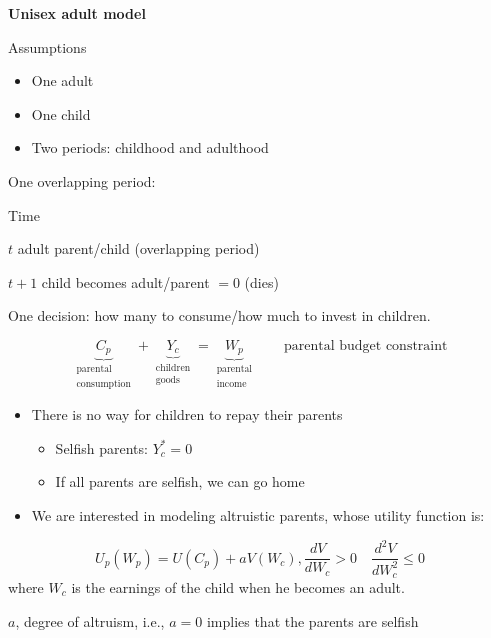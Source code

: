 \documentclass[14pt,notitlepage]{article}
\begin{document}
\vspace{10mm}

\noindent \textbf{Unisex adult model}

\noindent Assumptions

\begin{itemize}
\item One adult
\item One child
\item Two periods: childhood and adulthood
\end{itemize}

\noindent One overlapping period:

\noindent Time

$t$ adult parent/child (overlapping period)

$t+1$ child becomes adult/parent $= 0$ (dies)

\noindent One decision: how many to consume/how much to invest in children.

\begin{equation*}
\underbrace{C_{p}}_{\substack{\text{parental} \\ \text{consumption}}} + \underbrace{Y_{c}}_{\substack{\text{children} \\ \text{goods}}} =
\underbrace{W_{p}}_{\substack{\text{parental} \\ \text{income}}} \qquad \text{parental budget constraint}
\end{equation*}

\begin{itemize}
\item There is no way for children to repay their parents
	\begin{itemize}
	\item Selfish parents: $Y^{\ast}_c = 0$
	\item If all parents are selfish, we can go home
	\end{itemize}
\item We are interested in modeling altruistic parents, whose utility function is:
\end{itemize}

\begin{equation*}
U_p(W_p) = U(C_p) + a V(W_c), \frac{dV}{dW_c} > 0 \quad \frac{d^2 V}{dW^2_c} \leq 0
\end{equation*}
where $W_c$ is the earnings of the child when he becomes an adult.

\noindent $a$, degree of altruism, i.e., $a=0$ implies that the parents are selfish
\end{document}
